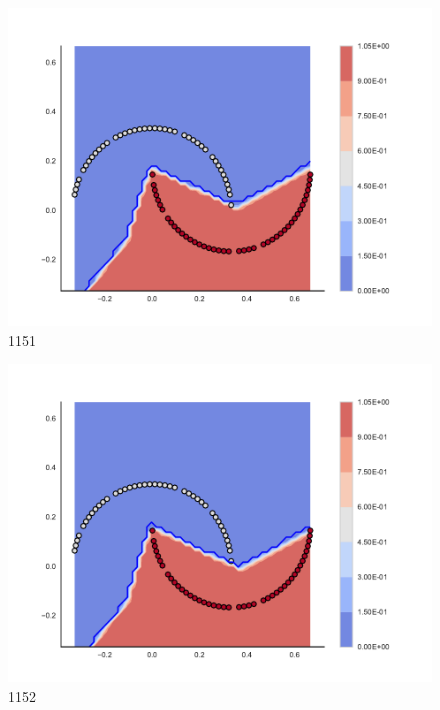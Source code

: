 \begin{subfigure}[b]{0.09\textwidth}
    \includegraphics[clip, trim=2.35cm 1.75cm 4.5cm 0cm,width=\textwidth]{img/convergence/1151.pdf}
    \caption{1151}
    \label{fig:convergence_1151}
\end{subfigure}
%
\begin{subfigure}[b]{0.09\textwidth}
    \includegraphics[clip, trim=2.35cm 1.75cm 4.5cm 0cm,width=\textwidth]{img/convergence/1152.pdf}
    \caption{1152}
    \label{fig:convergence_1152}
\end{subfigure}
%
